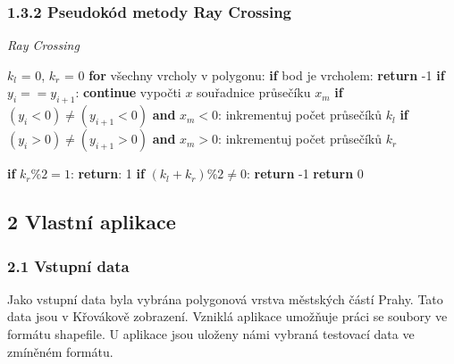 \subsubsection*{1.3.2 Pseudokód metody Ray Crossing}
\begin{algorithm}[H] 
    \caption {\textit{Ray Crossing}}
    \begin{algorithmic}[1]
        \State $k_l$ = 0, $k_r$ = 0                           
         \State \textbf{for} všechny vrcholy v polygonu:
         \State \indent \textbf{if} bod je
         vrcholem:
         \State \indent\indent \textbf{return} -1      
          \State \indent \textbf{if} $y_i == y_{i+1}$:  
          \State \indent \indent \textbf{continue}
        \State \indent vypočti $x$ souřadnice průsečíku $x_m$       
        \State \indent \textbf{if} $(y_i < 0) \neq (y_{i+1}<0)$ \textbf{and} $x_m<0$:         
        \State \indent \indent  inkrementuj počet průsečíků $k_l$        
        \State \indent \textbf{if} $(y_i>0) \neq (y_{i+1}>0)$ \textbf{and} $x_m>0$: 
        \State \indent \indent inkrementuj počet průsečíků $k_r$

        \State \textbf{if} $k_r\%2 = 1$:
        \State  \indent \textbf{return}: 1   
        \State \textbf{if} $(k_l + k_r) \%2  \neq 0$:
        \State  \indent \textbf{return} -1             
        \State  \textbf{return} 0
    \end{algorithmic}
\end{algorithm}

\newpage
\subsection*{2 Vlastní aplikace}

\subsubsection*{2.1 Vstupní data}

\noindent Jako vstupní data byla vybrána polygonová vrstva městských částí Prahy. Tato data jsou v Křovákově zobrazení. Vzniklá aplikace umožňuje práci se soubory ve formátu shapefile. U aplikace jsou uloženy námi vybraná testovací data ve zmíněném formátu.

